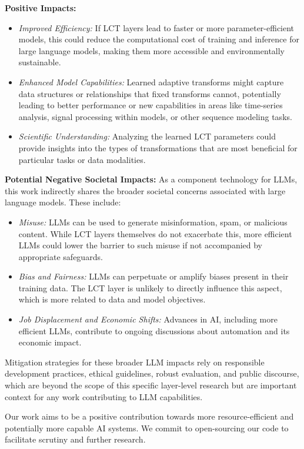 \textbf{Positive Impacts:}
\begin{itemize}
  \item \textit{Improved Efficiency:} If LCT layers lead to faster or more parameter-efficient models, this could reduce the computational cost of training and inference for large language models, making them more accessible and environmentally sustainable.
  \item \textit{Enhanced Model Capabilities:} Learned adaptive transforms might capture data structures or relationships that fixed transforms cannot, potentially leading to better performance or new capabilities in areas like time-series analysis, signal processing within models, or other sequence modeling tasks.
  \item \textit{Scientific Understanding:} Analyzing the learned LCT parameters could provide insights into the types of transformations that are most beneficial for particular tasks or data modalities.
\end{itemize}

\textbf{Potential Negative Societal Impacts:} As a component technology for LLMs, this work indirectly shares the broader societal concerns associated with large language models. These include:
\begin{itemize}
  \item \textit{Misuse:} LLMs can be used to generate misinformation, spam, or malicious content. While LCT layers themselves do not exacerbate this, more efficient LLMs could lower the barrier to such misuse if not accompanied by appropriate safeguards.
  \item \textit{Bias and Fairness:} LLMs can perpetuate or amplify biases present in their training data. The LCT layer is unlikely to directly influence this aspect, which is more related to data and model objectives.
  \item \textit{Job Displacement and Economic Shifts:} Advances in AI, including more efficient LLMs, contribute to ongoing discussions about automation and its economic impact.
\end{itemize}
Mitigation strategies for these broader LLM impacts rely on responsible development practices, ethical guidelines, robust evaluation, and public discourse, which are beyond the scope of this specific layer-level research but are important context for any work contributing to LLM capabilities.

Our work aims to be a positive contribution towards more resource-efficient and potentially more capable AI systems. We commit to open-sourcing our code to facilitate scrutiny and further research.